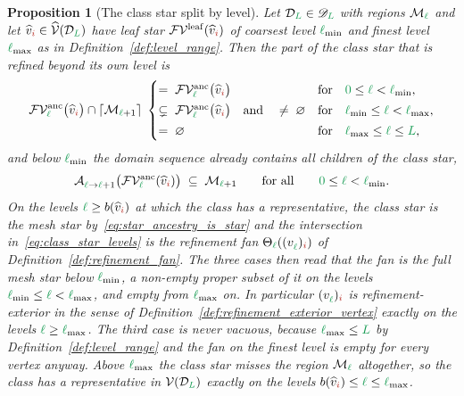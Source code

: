 \documentclass[a4paper, 12pt]{article}
\makeatletter
\newcommand{\lmin}{\l_{\min}}
\newcommand{\lmax}{\l_{\max}}
\newcommand{\green}{\color{ForestGreen}}
\newcommand{\brickred}{\color{BrickRed}}
\newcommand{\V}{\mathcal{V}}
\newcommand{\F}{\mathcal{F}}
\newcommand{\vertex}[2]{\freeQ{v}{}{#1}{#2}}
\newcommand{\vertexClass}[1]{\widehat{v}_{#1}}
\newcommand{\vertexClasses}{\widehat{\V}}
\newcommand{\coarseIdxone}{{\brickred i}}
\renewcommand{\l}{{\green\ell}}
\renewcommand{\L}{{\green L}}
\newcommand{\lzero}{{\green 0}}
\newcommand{\freeQ}[4]{ ( {#1}^{#2}_{#3} )_{#4}}
\newcommand{\Aop}[3]{\mathcal{A}^{#1}_{{#2} \to {#3}}}
\newcommand{\M}{\mathcal{M}}
\newtheorem{proposition}[theorem]{Proposition}
\theoremstyle{definition}
\theoremstyle{plain}
\numberwithin{equation}{section}
\newcommand{\ancestorPatch}[1]{\lceil #1 \rceil}
\DeclareRobustCommand{\domseq}[1][]{\mathcal{D}\ifx\@empty#1\@empty\else_{#1}\fi}
\newcommand{\alldomseqs}{\mathscr{D}}
\newcommand{\refFan}[1]{\Theta_{#1}}                        %
\newcommand{\birthLevel}{b}
\newcommand{\FVleaf}[1]{\F\V^{\mathrm{leaf}}_{#1}}          %
\newcommand{\FVanc}[1]{\F\V^{\mathrm{anc}}_{#1}}            %
\makeatother
\begin{document}
\begin{proposition}[The class star split by level]
    \label{proposition:class_star_levels}
    Let $\domseq[\L] \in \alldomseqs_\L$ with regions $\M_\l$ and let $\vertexClass{\coarseIdxone} \in \vertexClasses(\domseq[\L])$ have leaf star $\FVleaf{}(\vertexClass{\coarseIdxone})$ of coarsest level $\lmin$ and finest level $\lmax$ as in Definition~\ref{def:level_range}. Then the part of the class star that is refined beyond its own level is
    \begin{equation}
        \label{eq:class_star_levels}
        \FVanc{\l} \big( \vertexClass{\coarseIdxone} \big) \cap \ancestorPatch{\M_{\l+1}} \; \begin{cases}
            = \; \FVanc{\l} \big( \vertexClass{\coarseIdxone} \big) & \text{for} \quad \lzero \leq \l < \lmin , \\[2pt]
            \subsetneq \; \FVanc{\l} \big( \vertexClass{\coarseIdxone} \big) \quad \text{and} \quad \neq \; \varnothing & \text{for} \quad \lmin \leq \l < \lmax , \\[2pt]
            = \; \varnothing & \text{for} \quad \lmax \leq \l \leq \L ,
        \end{cases}
    \end{equation}
    and below $\lmin$ the domain sequence already contains all children of the class star,
    \begin{equation}
        \label{eq:class_star_children}
        \Aop{}{\l}{\l+1} \big( \FVanc{\l} ( \vertexClass{\coarseIdxone} ) \big) \; \subseteq \; \M_{\l+1} \qquad \text{for all} \qquad \lzero \leq \l < \lmin.
    \end{equation}
    On the levels $\l \geq \birthLevel(\vertexClass{\coarseIdxone})$ at which the class has a representative, the class star is the mesh star by~\eqref{eq:star_ancestry_is_star} and the intersection in~\eqref{eq:class_star_levels} is the refinement fan $\refFan{\l}(\vertex{\l}{\coarseIdxone})$ of Definition~\ref{def:refinement_fan}. The three cases then read that the fan is the full mesh star below $\lmin$, a non-empty proper subset of it on the levels $\lmin \leq \l < \lmax$, and empty from $\lmax$ on. In particular $\vertex{\l}{\coarseIdxone}$ is refinement-exterior in the sense of Definition~\ref{def:refinement_exterior_vertex} exactly on the levels $\l \geq \lmax$. The third case is never vacuous, because $\lmax \leq \L$ by Definition~\ref{def:level_range} and the fan on the finest level is empty for every vertex anyway. Above $\lmax$ the class star misses the region $\M_\l$ altogether, so the class has a representative in $\V(\domseq[\L])$ exactly on the levels $\birthLevel(\vertexClass{\coarseIdxone}) \leq \l \leq \lmax$.
\end{proposition}
\end{document}
